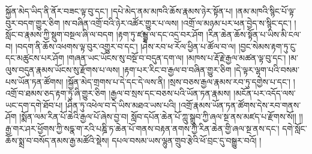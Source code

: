 སྐྱོན་མེད་ཡིད་ནི་ནོར་བཟང་ལྟ་བུ་དང་། །དཔེ་མེད་ནམ་མཁའི་ཆོས་རྣམས་ཉེར་སྟོན་པ། །ནམ་མཁའི་སྙིང་པོ་ལྟ་བུར་བདག་གྱུར་ཅིག །ས་བཞིན་འགྲོ་བའི་ཉེར་འཚོར་གྱུར་པ་ལས། །འགྲོ་ལ་མཉམ་པར་ཕན་བྱེད་ས་སྙིང་དང་། །སློང་བ་རྣམས་ཀྱི་སྡུག་བསྔལ་ཞི་ལ་བདག །རྟག་ཏུ་ཛམྦྷ་ལ་དང་འདྲ་བར་ཤོག །རིན་ཆེན་ཆོས་སྟོན་པ་ཡིས་མི་ངལ་བ། །བདག་ནི་ཆོས་འཕགས་ལྟ་བུར་འགྱུར་བ་དང་། །ཤེས་རབ་ཕ་རོལ་ཕྱིན་པ་ཚོལ་བ་ལ། །བྱང་སེམས་རྟག་ཏུ་ངུ་དང་མཚུངས་པར་ཤོག །གཞན་ཡང་ཡོངས་སུ་བསྔོ་བ་བདུན་དག་ལ། །མཁས་པ་རྡོ་རྗེ་རྒྱལ་མཚན་ལྟ་བུ་དང་། །མ་ལུས་བདུན་རྣམས་ཡོངས་སུ་རྫོགས་པ་ལས། །རྟག་པར་རིང་བ་རྒྱལ་བ་བཞིན་གྱུར་ཅིག །དེ་ལྟར་ལྷག་པའི་བསམ་པས་ཡོན་ཏན་ཚོགས། །སྐྱོན་མེད་གྲགས་པ་དེ་དང་དེ་ལས་ནི། །སྲས་བཅས་རྒྱལ་རྣམས་རབ་ཏུ་དགྱེས་པ་དང་། །འགྲོ་བ་ཐམས་ཅད་རྟག་ཏུ་ཞི་གྱུར་ཅིག །རྒྱལ་བ་སྲས་དང་བཅས་པའི་ཡོན་ཏན་རྣམས། །མངོན་པར་འདོད་ལས་ཡང་དག་དགེ་ཐོབ་པ། །ཤིན་ཏུ་འཕེལ་བ་དེ་ཡིས་མཐའ་ཡས་པའི། །འགྲོ་རྣམས་ཡོན་ཏན་ཚོགས་དེས་རབ་གནས་ཤོག །སྨོན་ལམ་རིན་པོ་ཆེའི་རྒྱལ་པོ་ཞེས་བྱ་བ། སློབ་དཔོན་ཆེན་པོ་ཀླུ་སྒྲུབ་ཀྱི་ཞལ་སྔ་ནས་མཛད་པ་རྫོགས་སོ།། །།རྒྱ་གར་ཤར་ཕྱོགས་ཀྱི་སདྣ་ག་རའི་པཎྜི་ཏ་ཆེན་པོ་གནས་བརྟན་ནགས་ཀྱི་རིན་ཆེན་གྱི་ཞལ་སྔ་ནས་དང་། དགེ་སློང་ཆོས་སྨྲ་བ་བསོད་ནམས་རྒྱ་མཚོའི་སྡེས། དཔལ་བསམ་ཡས་ལྷུན་གྲུབ་རྩེའི་ཕོ་བྲང་དུ་བསྒྱུར་བའོ། །